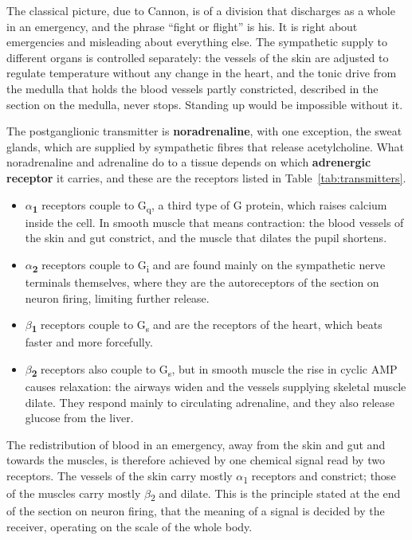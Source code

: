 \documentclass[11pt]{article}
\begin{document}
The classical picture, due to Cannon, is of a division that discharges as a whole in an emergency, and the phrase ``fight or flight'' is his. It is right about emergencies and misleading about everything else. The sympathetic supply to different organs is controlled separately: the vessels of the skin are adjusted to regulate temperature without any change in the heart, and the tonic drive from the medulla that holds the blood vessels partly constricted, described in the section on the medulla, never stops. Standing up would be impossible without it.

The postganglionic transmitter is \textbf{noradrenaline}, with one exception, the sweat glands, which are supplied by sympathetic fibres that release acetylcholine. What noradrenaline and adrenaline do to a tissue depends on which \textbf{adrenergic receptor} it carries, and these are the receptors listed in Table~\ref{tab:transmitters}.

\begin{itemize}
    \item \textbf{$\alpha$\textsubscript{1}} receptors couple to G\textsubscript{q}, a third type of G protein, which raises calcium inside the cell. In smooth muscle that means contraction: the blood vessels of the skin and gut constrict, and the muscle that dilates the pupil shortens.
    \item \textbf{$\alpha$\textsubscript{2}} receptors couple to G\textsubscript{i} and are found mainly on the sympathetic nerve terminals themselves, where they are the autoreceptors of the section on neuron firing, limiting further release.
    \item \textbf{$\beta$\textsubscript{1}} receptors couple to G\textsubscript{s} and are the receptors of the heart, which beats faster and more forcefully.
    \item \textbf{$\beta$\textsubscript{2}} receptors also couple to G\textsubscript{s}, but in smooth muscle the rise in cyclic AMP causes relaxation: the airways widen and the vessels supplying skeletal muscle dilate. They respond mainly to circulating adrenaline, and they also release glucose from the liver.
\end{itemize}

The redistribution of blood in an emergency, away from the skin and gut and towards the muscles, is therefore achieved by one chemical signal read by two receptors. The vessels of the skin carry mostly $\alpha$\textsubscript{1} receptors and constrict; those of the muscles carry mostly $\beta$\textsubscript{2} and dilate. This is the principle stated at the end of the section on neuron firing, that the meaning of a signal is decided by the receiver, operating on the scale of the whole body.
\end{document}

